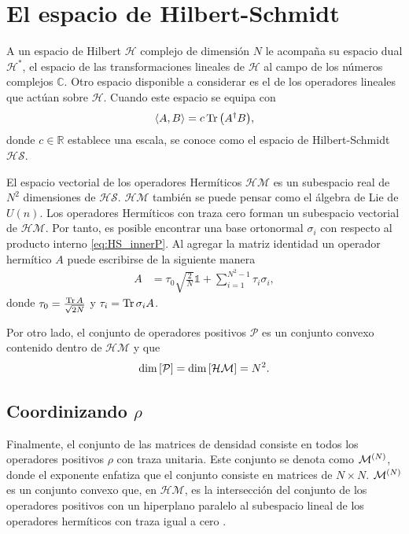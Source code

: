 \section{El espacio de Hilbert-Schmidt} %
A un espacio de Hilbert $\mathcal{H}$ complejo de dimensión $N$
le acompaña su espacio dual $\mathcal{H}^*$,
el espacio de las transformaciones lineales de $\mathcal{H}$
al campo de los números complejos $\mathbb{C}$. Otro espacio disponible 
a considerar es el de los operadores lineales que actúan sobre $\mathcal{H}$. 
Cuando este espacio se equipa con 
\begin{equation}
\langle A,B\rangle=c\Tr \qty(A^{\dagger}B),
\label{eq:HS_innerP}
\end{equation}
donde $c\in \mathbb{R}$ establece una escala, se conoce como el espacio de
Hilbert-Schmidt $\mathcal{HS}$. 

El espacio vectorial de los operadores Hermíticos 
$\mathcal{HM}$ es un subespacio real de $N^2$ dimensiones de $\mathcal{HS}$. 
$\mathcal{HM}$ también se puede pensar como el álgebra de Lie de $U(n)$. Los
operadores Hermíticos con traza cero forman un subespacio vectorial de
$\mathcal{HM}$. Por tanto, es posible encontrar una base ortonormal
$\sigma_i$ con
respecto al producto interno \eqref{eq:HS_innerP}. Al agregar la 
matriz identidad un operador hermítico $A$ puede escribirse de la siguiente
manera
\begin{align}
	A &= \tau_0\sqrt{\frac{2}{N}}\mathbb{1} + \sum _{i=1}^{N^2-1}\tau_i\sigma_i,
\end{align}
donde $\tau_0=\frac{\Tr A}{\sqrt{2N}}$ y $\tau_i=\Tr \sigma _iA$.
 
Por otro lado, el conjunto de operadores positivos $\mathcal{P}$ es un 
conjunto convexo contenido dentro de $\mathcal{HM}$ y que
\begin{align}
	\dim \qty[\mathcal{P}] = \dim \qty[\mathcal{HM}]=N^2.
\end{align}
\subsection{Coordinizando  $\rho$} %

Finalmente, el conjunto de las matrices de densidad consiste en todos los operadores
positivos $\rho$ con traza unitaria. Este conjunto se denota como 
$\mathcal{M}^{(N)}$, donde el exponente enfatiza que el conjunto consiste en 
matrices de $N\times N$. $\mathcal{M}^{(N)}$ es un conjunto convexo que, en $\mathcal{HM}$, 
es la intersección del conjunto de los operadores positivos con un 
hiperplano paralelo al subespacio lineal de los operadores hermíticos
con traza igual a cero \cite{bengtsson_zyczkowski_2017}.

